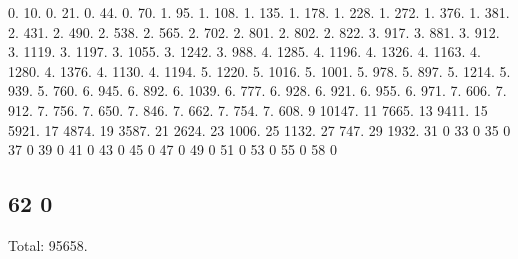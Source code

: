 0. 10. 0. 21. 0. 44. 0. 70. 1. 95. 1. 108. 1. 135. 1. 178. 1. 228. 1. 272. 1. 376. 1. 381. 2. 431. 2. 490. 2. 538. 2. 565. 2. 702. 2. 801. 2. 802. 2. 822. 3. 917. 3. 881. 3. 912. 3. 1119. 3. 1197. 3. 1055. 3. 1242. 3. 988. 4. 1285. 4. 1196. 4. 1326. 4. 1163. 4. 1280. 4. 1376. 4. 1130. 4. 1194. 5. 1220. 5. 1016. 5. 1001. 5. 978. 5. 897. 5. 1214. 5. 939. 5. 760. 6. 945. 6. 892. 6. 1039. 6. 777. 6. 928. 6. 921. 6. 955. 6. 971. 7. 606. 7. 912. 7. 756. 7. 650. 7. 846. 7. 662. 7. 754. 7. 608. 9 10147. 11 7665. 13 9411. 15 5921. 17 4874. 19 3587. 21 2624. 23 1006. 25 1132. 27 747. 29 1932. 31 0 33 0 35 0 37 0 39 0 41 0 43 0 45 0 47 0 49 0 51 0 53 0 55 0 58 0 \subsection*{62 0 }

Total\+: 95658. 